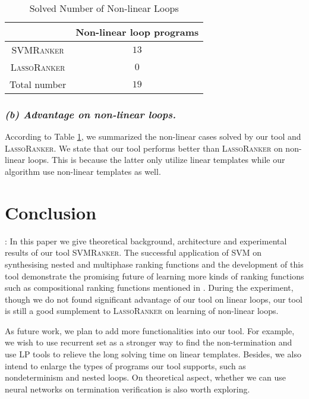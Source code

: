 \documentclass[UTF-8]{article}
\begin{document}
\begin{table}
\centering
\begin{tabular}{c|c}
& Non-linear loop programs \\
\hline
\textsc{SVMRanker} & $13$\\
\textsc{LassoRanker} & $0$\\
\hline
Total number & $19$  \\
\end{tabular}
\caption{Solved Number of Non-linear Loops}
\label{advantage_table}
\end{table}

\subsubsection{\textit{(b) Advantage on non-linear loops.}}
According to Table \ref{advantage_table}, we summarized the non-linear cases solved by our tool and \textsc{LassoRanker}. We state that our tool performs better than \textsc{LassoRanker} on non-linear loops. This is because the latter only utilize linear templates while our algorithm use non-linear templates as well.

{\color{blue}{lx: exp section is slightly long, to cut:xl}}

\section{Conclusion}:
In this paper we give theoretical background, architecture and experimental results of our tool \textsc{SVMRanker}. The successful application of SVM on synthesising nested and multiphase ranking functions and the development of this tool demonstrate the promising future of learning more kinds of ranking functions such as compositional ranking functions mentioned in \cite{linear ranking template}. During the experiment, though we do not found significant advantage of our tool on linear loops, our tool is still a good sumplement to \textsc{LassoRanker} on learning of non-linear loops.

As future work, we plan to add more functionalities into our tool. For example, we wish to use recurrent set as a stronger way to find the non-termination and use LP tools to relieve the long solving time on linear templates. Besides, we also intend to enlarge the types of programs our tool supports, such as nondeterminism and nested loops. On theoretical aspect, whether we can use neural networks on termination verification is also worth exploring. 

\clearpage 
\appendix
\end{document}
